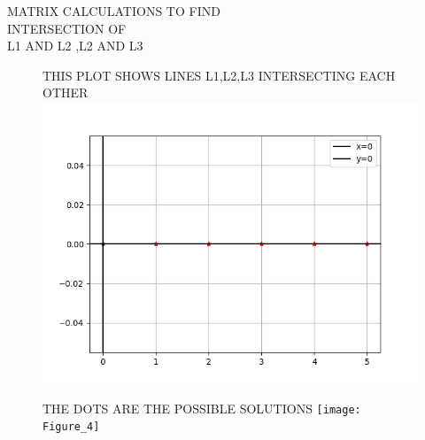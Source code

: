\documentclass[12pt,two column]{article}
\begin{document}
MATRIX CALCULATIONS TO FIND \\INTERSECTION OF\\ L1 AND L2 ,L2 AND L3
\clearpage
\begin{figure}
THIS PLOT SHOWS LINES L1,L2,L3 INTERSECTING EACH OTHER
\includegraphics[scale=1]{figure_3.png}
\end{figure}
\clearpage
\begin{figure}
THE DOTS ARE THE POSSIBLE SOLUTIONS
\texttt{[image: Figure\_4]}
\end{figure}
\end{document}
